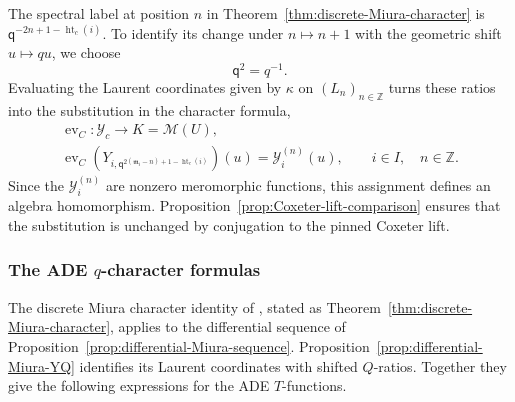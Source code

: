 \documentclass[11pt,leqno]{amsart}
\numberwithin{equation}{section}
\theoremstyle{plain}
\theoremstyle{definition}
\theoremstyle{plain}
\theoremstyle{definition}
\theoremstyle{remark}
\newcommand{\qaff}{\mathsf q}
\begin{document}
The spectral label at position $n$ in Theorem~\ref{thm:discrete-Miura-character} is $\qaff^{-2n+1-\operatorname{ht}_c(i)}$.  To identify its change under $n\mapsto n+1$ with the geometric shift $u\mapsto qu$, we choose
\begin{equation}\label{eq:qaff-full-step-front}
 \qaff^2=q^{-1}.
\end{equation}
Evaluating the Laurent coordinates given by $\kappa$ on $(L_n)_{n\in\mathbb Z}$ turns these ratios into the substitution in the character formula,
\begin{equation}\label{eq:differential-Y-evaluation}
 \begin{gathered}
 \operatorname{ev}_C:\mathscr Y_c\longrightarrow K=\mathcal M(U),\\
 \operatorname{ev}_C\!\left(
  Y_{i,\qaff^{2(\mathfrak m_i-n)+1-\operatorname{ht}_c(i)}}\right)(u)
       =\mathcal Y_i^{(n)}(u),\qquad i\in I,\quad n\in\mathbb Z.
 \end{gathered}
\end{equation}
Since the $\mathcal Y_i^{(n)}$ are nonzero meromorphic functions, this assignment defines an algebra homomorphism. Proposition~\ref{prop:Coxeter-lift-comparison} ensures that the substitution is unchanged by conjugation to the pinned Coxeter lift.

\subsubsection{The ADE \texorpdfstring{$q$}{q}-character formulas}
The discrete Miura character identity of \cite[Theorem~30]{FL2025}, stated as Theorem~\ref{thm:discrete-Miura-character}, applies to the differential sequence of Proposition~\ref{prop:differential-Miura-sequence}.  Proposition~\ref{prop:differential-Miura-YQ} identifies its Laurent coordinates with shifted $Q$-ratios.  Together they give the following expressions for the ADE $T$-functions.
\end{document}

